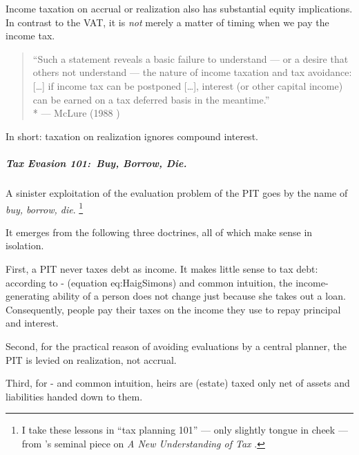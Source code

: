 Income taxation on accrual or realization also has substantial equity implications.
In contrast to the VAT, it is \emph{not} merely a matter of timing when we pay the income tax.

\begin{quote}
	``Such a statement reveals a basic failure to understand --- or a desire that others not understand --- the nature of income taxation and tax avoidance:
	[\ldots] if income tax can be postponed [\ldots], interest (or other capital income) can be earned on a tax deferred basis in the meantime.''
	\\*
	--- McLure (1988 \citealt[as cited in][125]{Seidman1997})
\end{quote}

In short:
taxation on realization ignores compound interest.

\subparagraph{Tax Evasion 101:~Buy, Borrow, Die.}
	\label{sec:TaxEvasion101}
A sinister exploitation of the evaluation problem of the PIT goes by the name of \emph{buy, borrow, die}.
\footnote{
	I take these lessons in ``tax planning 101'' --- only slightly tongue in cheek --- from \citeauthor{McCaffery2005}'s seminal piece on \emph{A New Understanding of Tax} \citeyearpar[888ff]{McCaffery2005}.
}

It emerges from the following three doctrines, all of which make sense in isolation.


First, a PIT never taxes debt as income.
It makes little sense to tax debt:
according to \citeauthor{Haig1921}-\citeauthor{Simons1938} (equation {eq:HaigSimons}) and common intuition, the income-generating ability of a person does not change just because she takes out a loan.
Consequently, people pay their taxes on the income they use to repay principal and interest.

Second, for the practical reason of avoiding evaluations by a central planner, the PIT is levied on realization, not accrual.

Third, for \citeauthor{Haig1921}-\citeauthor{Simons1938} and common intuition, heirs are (estate) taxed only net of assets and liabilities handed down to them.


